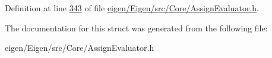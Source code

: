 Definition at line \hyperlink{eigen_2_eigen_2src_2_core_2_assign_evaluator_8h_source_l00343}{343} of file \hyperlink{eigen_2_eigen_2src_2_core_2_assign_evaluator_8h_source}{eigen/\+Eigen/src/\+Core/\+Assign\+Evaluator.\+h}.



The documentation for this struct was generated from the following file\+:\begin{DoxyCompactItemize}
\item 
eigen/\+Eigen/src/\+Core/\+Assign\+Evaluator.\+h\end{DoxyCompactItemize}
